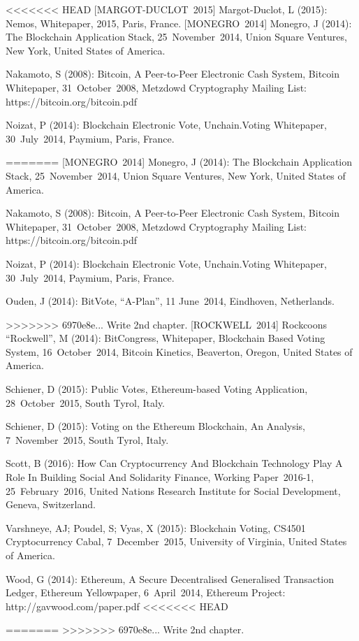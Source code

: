 \documentclass[9pt,oneside]{amsart}
\begin{document}
\begin{multicols}{2}
<<<<<<< HEAD
[MARGOT-DUCLOT~2015] Margot-Duclot, L (2015): Nemos, Whitepaper, 2015, Paris, France.
[MONEGRO~2014] Monegro, J (2014): The Blockchain Application Stack, 25~November~2014, Union Square Ventures, New York, United States of America.\par
[NAKAMOTO~2008] Nakamoto, S (2008): Bitcoin, A Peer-to-Peer Electronic Cash System, Bitcoin Whitepaper, 31~October~2008, Metzdowd Cryptography Mailing List: https://bitcoin.org/bitcoin.pdf\par
[NOIZAT~2014] Noizat, P (2014): Blockchain Electronic Vote, Unchain.Voting Whitepaper, 30~July~2014, Paymium, Paris, France.\par
=======
[MONEGRO~2014] Monegro, J (2014): The Blockchain Application Stack, 25~November~2014, Union Square Ventures, New York, United States of America.\par
[NAKAMOTO~2008] Nakamoto, S (2008): Bitcoin, A Peer-to-Peer Electronic Cash System, Bitcoin Whitepaper, 31~October~2008, Metzdowd Cryptography Mailing List: https://bitcoin.org/bitcoin.pdf\par
[NOIZAT~2014] Noizat, P (2014): Blockchain Electronic Vote, Unchain.Voting Whitepaper, 30~July~2014, Paymium, Paris, France.\par
[OUDEN~2014] Ouden, J (2014): BitVote, \enquote{A-Plan}, 11 June~2014, Eindhoven, Netherlands.\par
>>>>>>> 6970e8e... Write 2nd chapter.
[ROCKWELL~2014] Rockcoons \enquote{Rockwell}, M (2014): BitCongress, Whitepaper, Blockchain Based Voting System, 16~October~2014, Bitcoin Kinetics, Beaverton, Oregon, United States of America.\par
[SCHIENER~2015A] Schiener, D (2015): Public Votes, Ethereum-based Voting Application, 28~October~2015, South Tyrol, Italy.\par
[SCHIENER~2015B] Schiener, D (2015): Voting on the Ethereum Blockchain, An Analysis, 7~November~2015, South Tyrol, Italy.\par
[SCOTT~2016] Scott, B (2016): How Can Cryptocurrency And Blockchain Technology Play A Role In Building Social And Solidarity Finance, Working Paper~2016-1, 25~February~2016, United Nations Research Institute for Social Development, Geneva, Switzerland.\par
[VARSHNEYA~et~al.~2015] Varshneye, AJ; Poudel, S; Vyas, X (2015): Blockchain Voting, CS4501 Cryptocurrency Cabal, 7~December~2015, University of Virginia, United States of America.\par
[WOOD~2014] Wood, G (2014): Ethereum, A Secure Decentralised Generalised Transaction Ledger, Ethereum Yellowpaper, 6~April~2014, Ethereum Project: http://gavwood.com/paper.pdf
<<<<<<< HEAD

=======
>>>>>>> 6970e8e... Write 2nd chapter.

\end{multicols}
\end{document}
